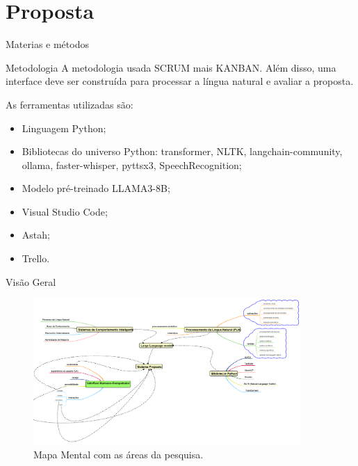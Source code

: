 \documentclass{beamer}
\begin{document}
\section{Proposta}  
\begin{frame}{Materias e métodos}

\begin{block}{Metodologia}
    A metodologia usada SCRUM mais KANBAN. Além disso,  uma interface deve ser construída para processar a língua natural e avaliar a proposta.    
\end{block}


As ferramentas utilizadas são:
\begin{itemize}
    \item Linguagem Python;
    \item Bibliotecas do universo Python: transformer, NLTK, langchain-community, ollama, faster-whisper, pyttsx3, SpeechRecognition;
    \item Modelo pré-treinado LLAMA3-8B;
    \item Visual Studio Code;
    \item Astah;
    \item Trello.
\end{itemize}
\end{frame}

\begin{frame}{Visão Geral}
    \begin{figure}[!h]
    \centering
    \includegraphics[width=4.0in]{images/Mapa mental.png}
    \caption{Mapa Mental com as áreas da pesquisa.} 
    \label{fig:Mapamental}
    \end{figure}
\end{frame}
\end{document}
